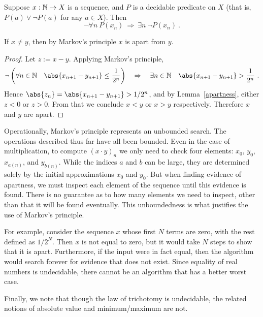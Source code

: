 \documentclass[leqno]{report}
\begin{document}
\begin{Definition}
    Suppose $x : \mathbb{N} \rightarrow X$ is a sequence, and $P$ is a decidable predicate on $X$ (that is, $P(a) \vee \neg P(a)$ for any $a \in X$). Then
    \[
        \neg \forall n\ P(x_n)
        \ \Rightarrow\ \exists n\ \neg P(x_n) \ .
    \]
\end{Definition}

\begin{Proposition}[Apartness]
    If $x \neq y$, then by Markov's principle $x$ is apart from $y$.
\end{Proposition}

\begin{proof}
    Let $z := x - y$. Applying Markov's principle,
    \[
        \neg \left( \fa{n \in \N}{\abs{x_{n+1} - y_{n+1}} \leq \frac{1}{2^n}} \right)
        \quad \Rightarrow \quad
        \ex{n \in \N}{\abs{x_{n+1} - y_{n+1}} > \frac{1}{2^n}} \ .
    \]
    Hence $\abs{z_n} = \abs{x_{n+1} - y_{n+1}} > 1/2^n$, and by Lemma~\ref{apartness}, either $z < 0$ or $z > 0$. From that we conclude $x < y$ or $x > y$ respectively. Therefore $x$ and $y$ are apart.
\end{proof}

Operationally, Markov's principle represents an unbounded search. The operations described thus far have all been bounded. Even in the case of multiplication, to compute $(x \cdot y)_n$ we only need to check four elements: $x_0$, $y_0$, $x_{a(n)}$, and $y_{b(n)}$. While the indices $a$ and $b$ can be large, they are determined solely by the initial approximations $x_0$ and $y_0$. But when finding evidence of apartness, we must inspect each element of the sequence until this evidence is found. There is no guarantee as to how many elements we need to inspect, other than that it will be found eventually. This unboundedness is what justifies the use of Markov's principle.

For example, consider the sequence $x$ whose first $N$ terms are zero, with the rest defined as $1/2^N$. Then $x$ is not equal to zero, but it would take $N$ steps to show that it is apart. Furthermore, if the input were in fact equal, then the algorithm would search forever for evidence that does not exist. Since equality of real numbers is undecidable, there cannot be an algorithm that has a better worst case.

Finally, we note that though the law of trichotomy is undecidable, the related notions of absolute value and minimum/maximum are not.
\end{document}
